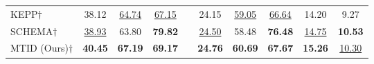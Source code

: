 \begin{table}[t]
{\begin{tabular}{lccccccccc}
{KEPP$\dagger$ }             &   38.12 & \underline{64.74} &  \underline{67.15}  &  &  24.15 &  \underline{59.05} &  \underline{66.64} &  14.20 &  9.27 \\
{SCHEMA$\dagger$}             &   \underline{38.93} & 63.80 & \bf \color{gray}79.82 &  &  \underline{24.50} &  58.48 &  \bf \color{gray}76.48 &  \underline{14.75} & \bf  10.53 \\
\midrule
{MTID (Ours)$\dagger$}             &   \bf 40.45 & \bf 67.19 & \bf 69.17  &  & \bf 24.76 & \bf 60.69 &  \bf 67.67 & \bf 15.26 & \underline{10.30} \\
\bottomrule
\end{tabular}
}

\label{tab:crosstask}
\end{table}
